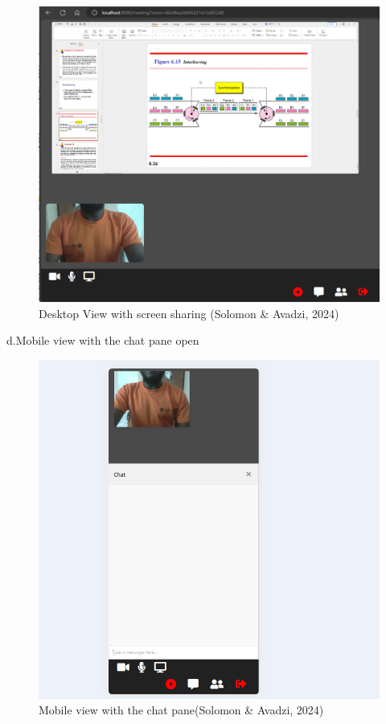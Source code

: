 \documentclass[a4paper,12pt]{article}  %
\begin{document}
\begin{figure}[H]
      \centering
      \includegraphics[width=1\textwidth]{figures/d-screenshare-open.png}
      \caption{Desktop View with screen sharing (Solomon \& Avadzi, 2024)}
\end{figure}
d.Mobile view with the chat pane open\\
\begin{figure}[H]
      \centering
      \includegraphics[width=1\textwidth]{figures/m-chats-open.png}
      \caption{Mobile view with the chat pane(Solomon \& Avadzi, 2024)}
\end{figure}
\end{document}
